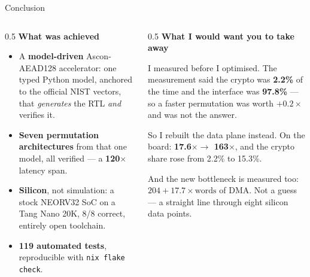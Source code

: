\documentclass[aspectratio=169,11pt]{beamer}
\newcommand{\code}[1]{\texttt{\small #1}}
\begin{document}
\begin{frame}{Conclusion}
\begin{columns}[T]
\begin{column}{0.5\textwidth}
{\small\color{docblue}\textbf{What was achieved}}
\begin{itemize}\footnotesize
\item A \textbf{model-driven} Ascon-AEAD128 accelerator: one typed Python model,
      anchored to the official NIST vectors, that \emph{generates} the RTL
      \emph{and} verifies it.
\item \textbf{Seven permutation architectures} from that one model, all verified
      --- a \textbf{120$\times$} latency span.
\item \textbf{Silicon}, not simulation: a stock NEORV32 SoC on a Tang Nano 20K,
      8/8 correct, entirely open toolchain.
\item \textbf{119 automated tests}, reproducible with \code{nix flake check}.
\end{itemize}
\end{column}
\begin{column}{0.5\textwidth}
{\small\color{docblue}\textbf{What I would want you to take away}}
\vspace{1mm}

{\footnotesize I measured before I optimised. The measurement said the crypto was
\textbf{2.2\%} of the time and the interface was \textbf{97.8\%} --- so a faster
permutation was worth $+0.2\times$ and was not the answer.}
\vspace{1mm}

{\footnotesize So I rebuilt the data plane instead. On the board:
\textbf{17.6$\times \rightarrow$ 163$\times$}, and the crypto share rose from
2.2\% to 15.3\%.}
\vspace{1mm}

{\footnotesize And the new bottleneck is measured too:
$204 + 17.7 \times \text{words}$ of DMA. Not a guess --- a straight line through
eight silicon data points.}
\vspace{2mm}

\begin{center}
\end{center}
\end{column}
\end{columns}
\end{frame}
\end{document}

